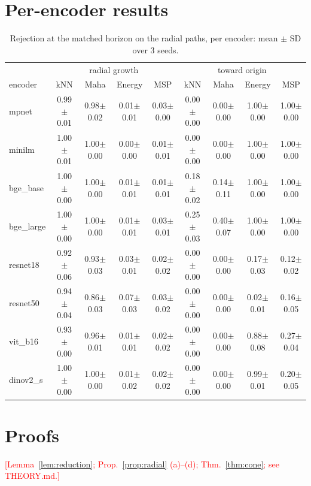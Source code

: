 \documentclass[11pt]{article}
\theoremstyle{definition}
\theoremstyle{remark}
\newcommand{\hole}[1]{\textcolor{red}{[#1]}}
\begin{document}
\section{Per-encoder results}
\begin{table}[!htbp]
\centering
\scriptsize
\caption{Rejection at the matched horizon on the radial paths, per encoder: mean $\pm$ SD over 3 seeds.}
\label{tab:perencoder}
\begin{tabular}{l cccc cccc}
\toprule
 & \multicolumn{4}{c}{radial growth} & \multicolumn{4}{c}{toward origin} \\
encoder & kNN & Maha & Energy & MSP & kNN & Maha & Energy & MSP \\
\midrule
mpnet & 0.99$\pm$0.01 & 0.98$\pm$0.02 & 0.01$\pm$0.01 & 0.03$\pm$0.00 & 0.00$\pm$0.00 & 0.00$\pm$0.00 & 1.00$\pm$0.00 & 1.00$\pm$0.00 \\
minilm & 1.00$\pm$0.01 & 1.00$\pm$0.00 & 0.00$\pm$0.00 & 0.01$\pm$0.01 & 0.00$\pm$0.00 & 0.00$\pm$0.00 & 1.00$\pm$0.00 & 1.00$\pm$0.00 \\
bge\_base & 1.00$\pm$0.00 & 1.00$\pm$0.00 & 0.01$\pm$0.01 & 0.01$\pm$0.01 & 0.18$\pm$0.02 & 0.14$\pm$0.11 & 1.00$\pm$0.00 & 1.00$\pm$0.00 \\
bge\_large & 1.00$\pm$0.00 & 1.00$\pm$0.00 & 0.01$\pm$0.01 & 0.03$\pm$0.01 & 0.25$\pm$0.03 & 0.40$\pm$0.07 & 1.00$\pm$0.00 & 1.00$\pm$0.00 \\
resnet18 & 0.92$\pm$0.06 & 0.93$\pm$0.03 & 0.03$\pm$0.01 & 0.02$\pm$0.02 & 0.00$\pm$0.00 & 0.00$\pm$0.00 & 0.17$\pm$0.03 & 0.12$\pm$0.02 \\
resnet50 & 0.94$\pm$0.04 & 0.86$\pm$0.03 & 0.07$\pm$0.03 & 0.03$\pm$0.02 & 0.00$\pm$0.00 & 0.00$\pm$0.00 & 0.02$\pm$0.01 & 0.16$\pm$0.05 \\
vit\_b16 & 0.93$\pm$0.00 & 0.96$\pm$0.01 & 0.01$\pm$0.01 & 0.02$\pm$0.02 & 0.00$\pm$0.00 & 0.00$\pm$0.00 & 0.88$\pm$0.08 & 0.27$\pm$0.04 \\
dinov2\_s & 1.00$\pm$0.00 & 1.00$\pm$0.00 & 0.01$\pm$0.02 & 0.02$\pm$0.02 & 0.00$\pm$0.00 & 0.00$\pm$0.00 & 0.99$\pm$0.01 & 0.20$\pm$0.05 \\
\bottomrule
\end{tabular}
\end{table}

\section{Proofs}
\hole{Lemma~\ref{lem:reduction}; Prop.~\ref{prop:radial} (a)--(d); Thm.~\ref{thm:cone}; see THEORY.md.}



\end{document}
